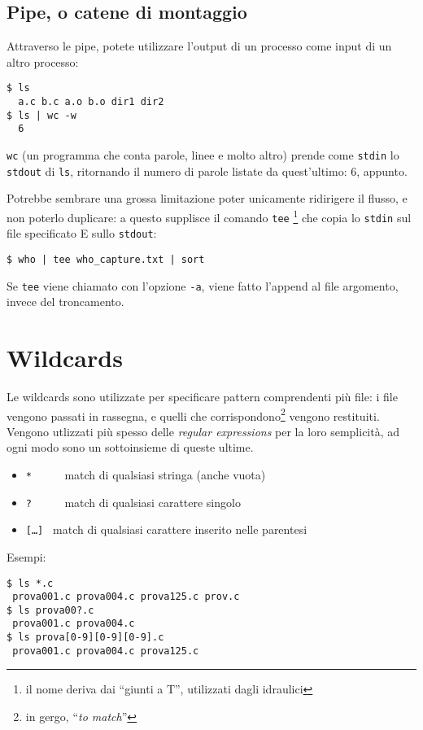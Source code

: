 \subsection*{Pipe, o catene di montaggio}
Attraverso le pipe, potete utilizzare l'output di un processo come input di un
altro processo:
\begin{verbatim}
$ ls
  a.c b.c a.o b.o dir1 dir2
$ ls | wc -w
  6
\end{verbatim}
\texttt{wc} (un programma che conta parole, linee e molto altro) prende come
\texttt{stdin} lo \texttt{stdout} di \texttt{ls}, ritornando il numero di
parole listate da quest'ultimo: 6, appunto.

\medskip
Potrebbe sembrare una grossa limitazione poter unicamente ridirigere il
flusso, e non poterlo duplicare: a questo supplisce il comando \texttt{tee}
\footnote{il nome deriva dai ``giunti a T'', utilizzati dagli idraulici}
che copia lo \texttt{stdin} sul file specificato E sullo \texttt{stdout}:
\begin{verbatim}
$ who | tee who_capture.txt | sort
\end{verbatim}
Se \texttt{tee} viene chiamato con l'opzione \texttt{-a}, viene fatto l'append
al file argomento, invece del troncamento.

\section{Wildcards}
Le wildcards sono utilizzate per specificare pattern comprendenti pi\`u file:
i file vengono passati in rassegna, e quelli che corrispondono\footnote{in
gergo, ``\emph{to match}''} vengono restituiti. Vengono utlizzati pi\`u spesso
delle \textit{regular expressions} per la loro semplicit\`a, ad ogni modo sono
un sottoinsieme di queste ultime.
\begin{itemize}
	\item \texttt{*\ \ \ \ \ } match di qualsiasi stringa (anche vuota)
	\item \texttt{?\ \ \ \ \ } match di qualsiasi carattere singolo
	\item \texttt{[\ldots]\ } match di qualsiasi carattere inserito nelle
		parentesi
\end{itemize}
Esempi:
\begin{verbatim}
$ ls *.c
 prova001.c prova004.c prova125.c prov.c
$ ls prova00?.c
 prova001.c prova004.c
$ ls prova[0-9][0-9][0-9].c
 prova001.c prova004.c prova125.c
\end{verbatim}

